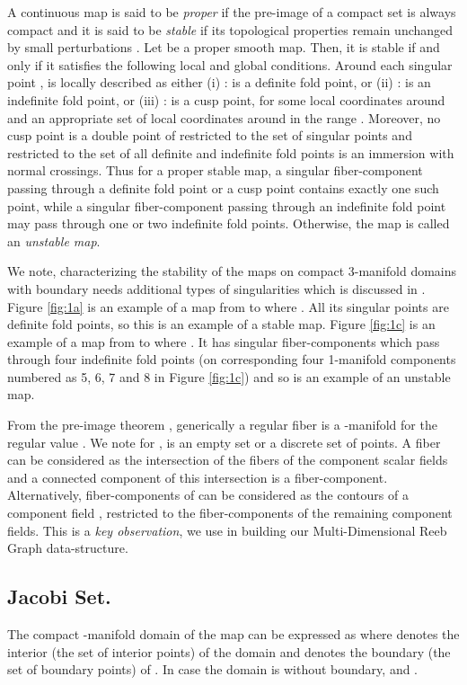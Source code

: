 \documentclass[twocolumn]{article}
\newcommand{\figref}[1]{Figure \ref{fig:#1}}
\begin{document}
A continuous map is said to be \emph{proper} if the pre-image
of a compact set is always compact and  it is said to be \emph{stable} if its topological properties remain unchanged
by small perturbations \cite{Levine1985}. 
Let  be a proper smooth map. Then, it is stable if and only if it satisfies the following local and global conditions.
Around each singular
point ,  is locally described as either (i) :  is a definite fold point, or (ii) :  is an indefinite fold point, or (iii) :  is a cusp point, for some local coordinates   around 
and an appropriate set of local coordinates around  in the range .
Moreover, no cusp point is a double point of  restricted to the set
of singular points and  restricted to the set of all definite and
indefinite fold points is an immersion with normal crossings. 
Thus for a proper stable map, a singular fiber-component passing through a definite fold
point or a cusp point contains exactly one such point, while
a singular fiber-component passing through an indefinite fold point may pass through one or two indefinite fold
points. Otherwise, the map is called an \emph{unstable map}.


We note, characterizing the stability of the maps on compact 3-manifold domains with boundary 
needs additional types of singularities which is discussed in \cite{Saeki2015}.
\figref{1a} is an example of a map from  to  where .
All its singular points are definite fold points, so this is an example of a stable map. \figref{1c}
is an example of a map from  to  where . It has singular fiber-components which pass
  through four indefinite fold points (on corresponding four 1-manifold components
  numbered as 5, 6, 7 and 8 in \figref{1c}) and so is an example of an unstable map. 


From the pre-image theorem \cite{1974-gp-dt}, generically a regular fiber
 is a -manifold for the regular value . 
We note for ,  is an empty set or a discrete set of points.
A fiber  can be considered as the intersection of
the fibers of the component scalar fields
 and
a connected component of this intersection is a
fiber-component. Alternatively, fiber-components of
 can be considered as the contours of a
component field , restricted to the fiber-components of the
remaining component fields. This is a \textit{key observation}, we use
in building our Multi-Dimensional Reeb Graph data-structure.

\subsection*{Jacobi Set.}  The compact -manifold domain  of the map  can be expressed as
 where
 denotes the interior (the set of interior points) of
the domain  and  denotes the boundary (the set of boundary
points) of .  In case the domain  is without boundary,  and . 
\end{document}
